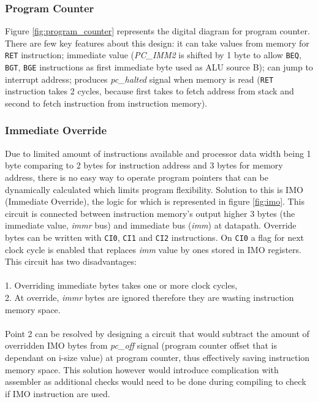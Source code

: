\documentclass[a4paper,12pt]{article}
\begin{document}
\begin{multicols}{2}

\subsubsection{Program Counter} \label{sec:pc}
Figure \ref{fig:program_counter} represents the digital diagram for program counter. There are few key features about this design: it can take values from memory for \texttt{RET} instruction; immediate value (\textit{PC\_IMM2} is shifted by 1 byte to allow \texttt{BEQ}, \texttt{BGT}, \texttt{BGE} instructions as first immediate byte used as ALU source B); can jump to interrupt address; produces \textit{pc\_halted} signal when memory is read (\texttt{RET} instruction takes 2 cycles, because first takes to fetch address from stack and second to fetch instruction from instruction memory).


\subsubsection{Immediate Override} \label{sec:imo}
Due to limited amount of instructions available and processor data width being 1 byte comparing to 2 bytes for instruction address and 3 bytes for memory address, there is no easy way to operate program pointers that can be dynamically calculated which limits program flexibility. Solution to this is IMO (Immediate Override), the logic for which is represented in figure \ref{fig:imo}. This circuit is connected between instruction memory's output higher 3 bytes (the immediate value, \textit{immr} bus) and immediate bus (\textit{imm}) at datapath. Override bytes can be written with \texttt{CI0}, \texttt{CI1} and \texttt{CI2} instructions. On \texttt{CI0} a flag for next clock cycle is enabled that replaces \textit{imm} value by ones stored in IMO registers. This circuit has two disadvantages: \\
\\
1. Overriding immediate bytes takes one or more clock cycles,\\
2. At override, \textit{immr} bytes are ignored therefore they are wasting instruction memory space.\\
\\
Point 2 can be resolved by designing a circuit that would subtract the amount of overridden IMO bytes from \textit{pc\_off} signal (program counter offset that is dependant on i-size value) at program counter, thus effectively saving instruction memory space. This solution however would introduce complication with assembler as additional checks would need to be done during compiling to check if IMO instruction are used.
\end{multicols}
\end{document}
